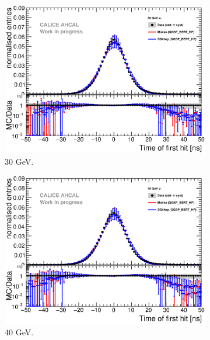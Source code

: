 \documentclass{JINST}
\begin{document}
\begin{figure}[htbp!]
\begin{subfigure}[t]{0.49\textwidth}
    \includegraphics[width=1\textwidth]{fig/Comparison_SimData_Electrons30GeV.eps}
    \caption{30 GeV.}\label{fig:elec_sim_data_30GeV}
  \end{subfigure}
  \hfill
  \begin{subfigure}[t]{0.49\textwidth}
    \centering
    \includegraphics[width=1\textwidth]{fig/Comparison_SimData_Electrons40GeV.eps}
    \caption{40 GeV.}\label{fig:elec_sim_data_40GeV}
  \end{subfigure}
  \hfill
  \begin{subfigure}[t]{0.49\textwidth}
    \centering

\end{subfigure}
\end{figure}
\end{document}
